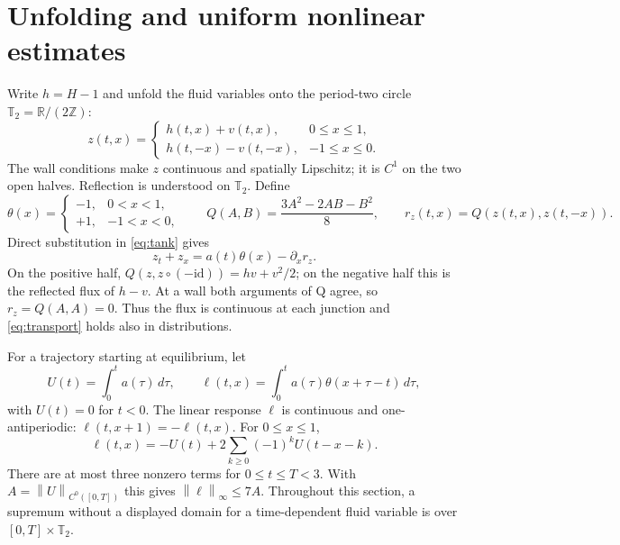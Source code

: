 \documentclass[11pt]{article}
\newcommand{\norm}[1]{\left\|#1\right\|}
\newcommand{\Tt}{\mathbb T_2}
\begin{document}
\section{Unfolding and uniform nonlinear estimates}
Write $h=H-1$ and unfold the fluid variables onto the period-two circle
$\Tt=\mathbb R/(2\mathbb Z)$:
\begin{equation}\label{eq:z}
z(t,x)=\begin{cases}h(t,x)+v(t,x),&0\le x\le1,\\
h(t,-x)-v(t,-x),&-1\le x\le0.
\end{cases}
\end{equation}
The wall conditions make $z$ continuous and spatially Lipschitz; it is $C^1$
on the two open halves. Reflection is understood on $\Tt$. Define
\[
\theta(x)=\begin{cases}-1,&0<x<1,\\+1,&-1<x<0,\end{cases}
\qquad
Q(A,B)=\frac{3A^2-2AB-B^2}{8},\qquad
r_z(t,x)=Q(z(t,x),z(t,-x)).
\]
Direct substitution in \eqref{eq:tank} gives
\begin{equation}\label{eq:transport}
z_t+z_x=a(t)\theta(x)-\partial_xr_z.
\end{equation}
On the positive half, $Q(z,z\circ(-\mathrm{id}))=hv+v^2/2$; on the
negative half this is the reflected flux of $h-v$. At a wall both arguments
of Q agree, so $r_z=Q(A,A)=0$. Thus the flux is continuous at each junction
and \eqref{eq:transport} holds also in distributions.

For a trajectory starting at equilibrium, let
\[
U(t)=\int_0^t a(\tau)\,d\tau,\qquad
\ell(t,x)=\int_0^t a(\tau)\theta(x+\tau-t)\,d\tau,
\]
with $U(t)=0$ for $t<0$. The linear response $\ell$ is continuous and
one-antiperiodic: $\ell(t,x+1)=-\ell(t,x)$. For $0\le x\le1$,
\begin{equation}\label{eq:linear}
\ell(t,x)=-U(t)+2\sum_{k\ge0}(-1)^kU(t-x-k).
\end{equation}
There are at most three nonzero terms for $0\le t\le T<3$. With
$A=\norm{U}_{C^0([0,T])}$ this gives $\norm{\ell}_\infty\le7A$.
Throughout this section, a supremum without a displayed domain for a
time-dependent fluid variable is over $[0,T]\times\Tt$.
\end{document}
